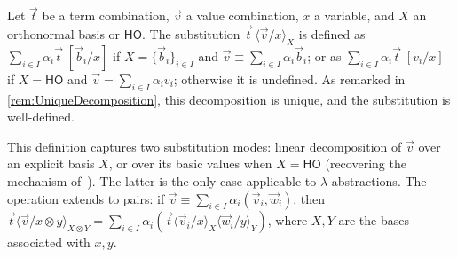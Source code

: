 \documentclass[a4paper,UKenglish,numberwithinsect,pdfa,anonymous]{lipics-v2021}
\theoremstyle{restatestyle}
\newcommand\ansubst[2]{\ensuremath{\langle #1 \rangle_{#2}}}
\newcommand\AbsBasis{\ensuremath{\mathsf{H\!O}}}
\def\ds{\displaystyle}
\begin{document}
\begin{definition}\label{def:basisDependentSub}
  Let $\vec t$ be a term combination, $\vec v$ a value combination, $x$ a
  variable, and $X$ an orthonormal basis or $\AbsBasis$. The substitution 
  $\vec t\,\ansubst{\vec v/x}{X}$ is defined as $\sum_{i\in I}\alpha_i
  \vec{t}\;[\vec{b}_i/x]$ if $X=\{\vec{b}_i\}_{i\in I}$ and $\vec{v}\equiv
  \sum_{i\in I} \alpha_i\vec{b}_i$; or as $\sum_{i\in I}\alpha_i\vec{t}\;[v_i/x]$
  if $X=\AbsBasis$ and $\vec{v}=\sum_{i\in I} \alpha_i v_i$; otherwise it is
  undefined. As remarked in \ref{rem:UniqueDecomposition}, this decomposition
  is unique, and the substitution is well-defined.
\end{definition}

This definition captures two substitution modes: linear decomposition of $\vec v$
over an explicit basis $X$, or over its basic values when $X=\AbsBasis$
(recovering the mechanism of~\cite{ArrighiDowekLMCS17}). The latter is the only
case applicable to $\lambda$-abstractions. The operation extends to pairs: if
$\vec v\equiv\sum_{i\in I}\alpha_i(\vec{v}_i, \vec{w}_i)$, then $\vec t
\ansubst{\vec v/x\otimes y}{X\otimes Y} = \sum_{i\in I}\alpha_i (\vec t
\ansubst{\vec{v}_i/x}{X}\ansubst{\vec{w}_i/y}{Y})$, where $X, Y$ are
the bases associated with $x, y$.
\end{document}
